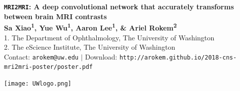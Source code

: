 \documentclass[a0, portrait]{a0poster}
\begin{document}


\begin{minipage}[b]{0.9\linewidth}
\veryHuge \color{NavyBlue} \textbf{{\tt MRI2MRI}: A deep convolutional network that accurately transforms between brain MRI contrasts} \color{Black}\\ %
\huge \textbf{Sa Xiao\textsuperscript{1}, Yue Wu\textsuperscript{1}, Aaron Lee\textsuperscript{1}, \& Ariel Rokem\textsuperscript{2}}\\ %
\Large 1. The Department of Ophthalmology, The University of Washington \\ 2. The eScience Institute, The University of Washington \\%
\Large Contact: \texttt{arokem@uw.edu} $|$ Download: \texttt{http://arokem.github.io/2018-cns-mri2mri-poster/poster.pdf}
\end{minipage}
%
%
\begin{minipage}[b]{0.1\linewidth}
\texttt{[image: UWlogo.png]}
\end{minipage}

\vspace{0.5cm} %
\end{document}
